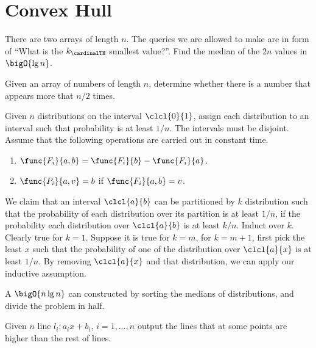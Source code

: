 \section*{Convex Hull}
\begin{exercise}
    \item There are two arrays of length \(n\). The queries we are allowed to make are in form of ``What is the \(k_{\cardinalTH}\) smallest value?''. Find the median of the \(2n\) values in \(\bigO{\lg n}\).
    \item Given an array of numbers of length \(n\), determine whether there is a number that appears more that \(n/2\) times.
    \item Given \(n\) distributions on the interval \(\clcl{0}{1}\), assign each distribution to an interval such that probability is at least \(1/n\). The intervals must be disjoint. Assume that the following operations are carried out in constant time.
    \begin{enumerate}
        \item \(\func{F_i}{a,b} = \func{F_i}{b} - \func{F_i}{a}\).
        \item \(\func{P_i}{a,v} = b\) if \(\func{F_i}{a,b} = v\).
    \end{enumerate}
    \begin{solution}
        We claim that an interval \(\clcl{a}{b}\) can be partitioned by \(k\) distribution such that the probability of each distribution over its partition is at least \(1/n\), if the probability each distribution over \(\clcl{a}{b}\) is at least \(k/n\). Induct over \(k\). Clearly true for \(k = 1\). Suppose it is true for \(k = m\), for \(k = m + 1\), first pick the least \(x\) such that the probability of one of the distribution over \(\clcl{a}{x}\) is at least \(1/n\). By removing \(\clcl{a}{x}\) and that distribution, we can apply our inductive assumption. 
        
        A \(\bigO{n \lg n}\) can constructed by sorting the medians of distributions, and divide the problem in half.
    \end{solution}
    \item Given \(n\) line \(l_i: a_i x + b_i\), \(i =1, \dots, n\) output the lines that at some points are higher than the rest of lines. 
\end{exercise} 